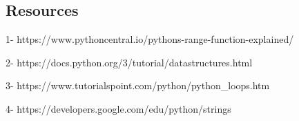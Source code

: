 \documentclass[11pt]{article}
\begin{document}
    \subsection{Resources}\label{resources}

    1- https://www.pythoncentral.io/pythons-range-function-explained/

2- https://docs.python.org/3/tutorial/datastructures.html

3- https://www.tutorialspoint.com/python/python\_loops.htm

4- https://developers.google.com/edu/python/strings


    
    
    
    
\end{document}

